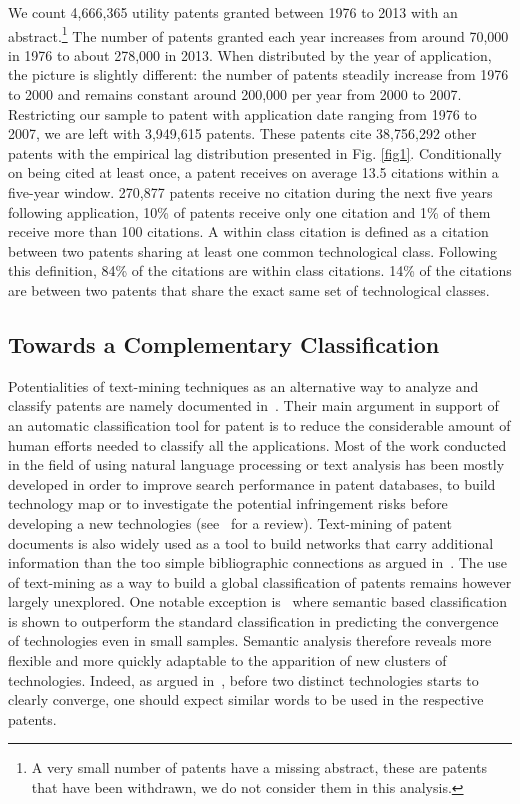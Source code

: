 \documentclass[10pt,A4]{article}
\begin{document}
We count 4,666,365 utility patents granted between 1976 to 2013 with an abstract.\footnote{A very small number of patents have a missing abstract, these are patents that have been withdrawn, we do not consider them in this analysis.} The number of patents granted each year increases from around 70,000 in 1976 to about 278,000 in 2013. When distributed by the year of application, the picture is slightly different: the number of patents steadily increase from 1976 to 2000 and remains constant around 200,000 per year from 2000 to 2007. Restricting our sample to patent with application date ranging from 1976 to 2007, we are left with 3,949,615 patents. These patents cite 38,756,292 other patents with the empirical lag distribution presented in Fig. \ref{fig1}. Conditionally on being cited at least once, a patent receives on average 13.5 citations within a five-year window. 270,877 patents receive no citation during the next five years following application, 10\% of patents receive only one citation and 1\% of them receive more than 100 citations. A within class citation is defined as a citation between two patents sharing at least one common technological class. Following this definition, 84\% of the citations are within class citations. 14\% of the citations are between two patents that share the exact same set of technological classes.


\subsection{Towards a Complementary Classification}

Potentialities of text-mining techniques as an alternative way to analyze and classify patents are namely documented in~\cite{tseng2007text}. Their main argument in support of an automatic classification tool for patent is to reduce the considerable amount of human efforts needed to classify all the applications. Most of the work conducted in the field of using natural language processing or text analysis has been mostly developed in order to improve search performance in patent databases, to build technology map or to investigate the potential infringement risks before developing a new technologies (see~\cite{abbas2014literature} for a review). Text-mining of patent documents is also widely used as a tool to build networks that carry additional information than the too simple bibliographic connections as argued in~\cite{yoon2004text}. The use of text-mining as a way to build a global classification of patents remains however largely unexplored. One notable exception is~\cite{preschitschek2013} where semantic based classification is shown to outperform the standard classification in predicting the convergence of technologies even in small samples. Semantic analysis therefore reveals more flexible and more quickly adaptable to the apparition of new clusters of technologies. Indeed, as argued in~\cite{preschitschek2013}, before two distinct technologies starts to clearly converge, one should expect similar words to be used in the respective patents.
\end{document}
